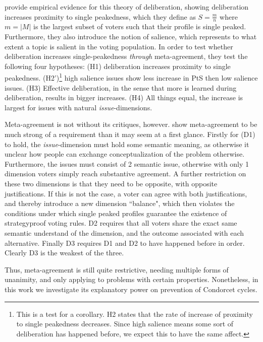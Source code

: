 \citet{listDeliberationSinglePeakednessPossibility2013} provide empirical evidence for this theory of deliberation, showing deliberation increases proximity to single peakedness, which they define as $S= \frac{m}{n}$ where $m = |M|$ is the largest subset of voters such that their profile is single peaked. Furthermore, they also introduce the notion of salience, which represents to what extent a topic is salient in the voting population. In order to test whether deliberation increases single-peakedness \textit{through} meta-agreement, they test the following four hypotheses: (H1) deliberation increases proximity to single peakedness. (H2')\footnote{This is a test for a corollary. H2 states that the rate of increase of proximity to single peakedness decreases. Since high salience means some sort of deliberation has happened before, we expect this to have the same affect.} high salience issues show less increase in PtS then low salience issues. (H3) Effective deliberation, in the sense that more is learned during deliberation, results in bigger increases. (H4) All things equal, the increase is largest for issues with natural \textit{issue}-dimensions.

Meta-agreement is not without its critiques, however. \citet{ottonelliElusiveNotionMetaagreement2013} show meta-agreement to be much strong of a requirement than it may seem at a first glance. Firstly for (D1) to hold, the \textit{issue}-dimension must hold some semantic meaning, as otherwise it unclear how people can exchange conceptualization of the problem otherwise. Furthermore, the issues must consist of 2 semantic issue, otherwise with only 1 dimension voters simply reach substantive agreement. A further restriction on these two dimensions is that they need to be opposite, with opposite justifications. If this is not the case, a voter can agree with both justifications, and thereby introduce a new dimension ``balance", which then violates the conditions under which single peaked profiles guarantee the existence of strategyproof voting rules. D2 requires that all voters share the exact same semantic understand of the dimension, and the outcome associated with each alternative. Finally D3 requires D1 and D2 to have happened before in order. Clearly D3 is the weakest of the three.

Thus, meta-agreement is still quite restrictive, needing multiple forms of unanimity, and only applying to problems with certain properties. Nonetheless, in this work we investigate its explanatory power on prevention of Condorcet cycles.

